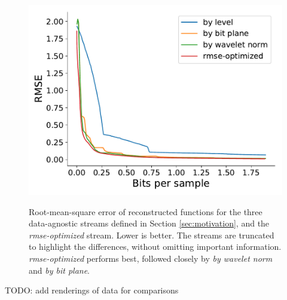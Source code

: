 \begin{figure}
 	{\includegraphics[width=0.48\linewidth]{img/rmse/rmse-optimized-velocityz.pdf}}
 	\caption{Root-mean-square error of reconstructed functions for the three data-agnostic streams
 	defined in Section \ref{sec:motivation}, and the \emph{rmse-optimized} stream. Lower is better.
 	The streams are truncated to highlight the differences, without omitting important information.
 	\emph{rmse-optimized} performs best, followed closely by \emph{by wavelet norm} and \emph{by bit
 	plane}.}
 	\label{fig:rmse-optimized}
\end{figure}

TODO: add renderings of data for comparisons
